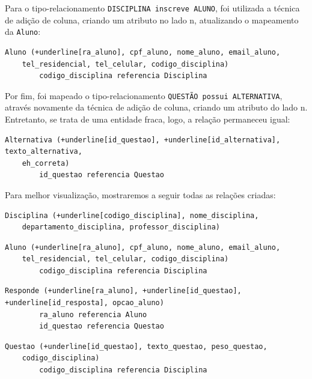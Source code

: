\documentclass[12pt,a4paper]{article}
\begin{document}
Para o tipo-relacionamento \texttt{DISCIPLINA inscreve ALUNO}, foi utilizada a técnica de adição de coluna, criando um atributo no lado n, atualizando o mapeamento da \texttt{Aluno}:

\begin{Verbatim}[commandchars=+\[\]]
    Aluno (+underline[ra_aluno], cpf_aluno, nome_aluno, email_aluno,
    tel_residencial, tel_celular, codigo_disciplina)
        codigo_disciplina referencia Disciplina
\end{Verbatim}

Por fim, foi mapeado o tipo-relacionamento \texttt{QUESTÃO possui ALTERNATIVA}, através novamente da técnica de adição de coluna, criando um atributo do lado n. Entretanto, se trata de uma entidade fraca, logo, a relação permaneceu igual:

\begin{Verbatim}[commandchars=+\[\]]
    Alternativa (+underline[id_questao], +underline[id_alternativa], texto_alternativa, 
    eh_correta)
        id_questao referencia Questao
\end{Verbatim}

Para melhor visualização, mostraremos a seguir todas as relações criadas:\\


\begin{Verbatim}[commandchars=+\[\]]
    Disciplina (+underline[codigo_disciplina], nome_disciplina,
    departamento_disciplina, professor_disciplina)
\end{Verbatim}

\begin{Verbatim}[commandchars=+\[\]]
    Aluno (+underline[ra_aluno], cpf_aluno, nome_aluno, email_aluno,
    tel_residencial, tel_celular, codigo_disciplina)
        codigo_disciplina referencia Disciplina
\end{Verbatim}


\begin{Verbatim}[commandchars=+\[\]]
    Responde (+underline[ra_aluno], +underline[id_questao], +underline[id_resposta], opcao_aluno)
        ra_aluno referencia Aluno
        id_questao referencia Questao
\end{Verbatim}

\begin{Verbatim}[commandchars=+\[\]]
    Questao (+underline[id_questao], texto_questao, peso_questao,
    codigo_disciplina)
        codigo_disciplina referencia Disciplina
\end{Verbatim}
\end{document}
